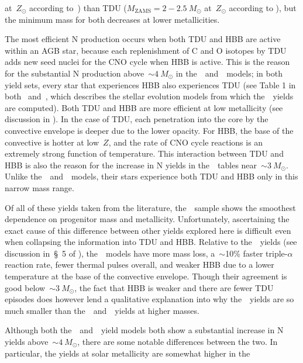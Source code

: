 \documentclass[ms.tex]{subfiles}
\begin{document}
at~$Z_\odot$ according to~\citealt{Karakas2010}) than TDU
($M_\text{ZAMS} = 2 - 2.5~M_\odot$ at~$Z_\odot$ according to
\citealt{Karakas2010}), but the minimum mass for both decreases at lower
metallicities.
\par
The most efficient N production occurs when both TDU and HBB are active within
an AGB star, because each replenishment of C and O isotopes by TDU adds new
seed nuclei for the CNO cycle when HBB is active.
This is the reason for the substantial N production above~$\sim4~M_\odot$ in
the~\karakasten~and~\karakas~models; in both yield sets, every star that
experiences HBB also experiences TDU (see Table 1 in both~\citealt{Karakas2010}
and~\citealt{Karakas2014}, which describes the stellar evolution models from
which the~\karakas~yields are computed).
Both TDU and HBB are more efficient at low metallicity (see discussion in
\citealt{Ventura2013}).
In the case of TDU, each penetration into the core by the convective envelope
is deeper due to the lower opacity.
For HBB, the base of the convective is hotter at low~$Z$, and the rate of CNO
cycle reactions is an extremely strong function of temperature.
This interaction between TDU and HBB is also the reason for the increase in N
yields in the~\ventura~tables near~$\sim3~M_\odot$.
Unlike the~\karakasten~and~\karakas~models, their stars experience both TDU and
HBB only in this narrow mass range.
\par
Of all of these yields taken from the literature, the~\cristallo~sample shows
the smoothest dependence on progenitor mass and metallicity.
Unfortunately, ascertaining the exact cause of this difference between other
yields explored here is difficult even when collapsing the information into
TDU and HBB.
Relative to the~\karakas~yields (see discussion in~\S~5 of
\citealt{Karakas2016}), the~\cristallo~models have more mass loss, a~$\sim$10\%
faster triple-$\alpha$ reaction rate, fewer thermal pulses overall, and weaker
HBB due to a lower temperature at the base of the convective envelope.
Though their agreement is good below~$\sim3~M_\odot$, the fact that HBB is
weaker and there are fewer TDU episodes does however lend a qualitative
explanation into why the~\cristallo~yields are so much smaller than
the~\karakasten~and~\karakas~yields at higher masses.
\par
Although both the~\karakasten~and~\karakas~yield models both show a substantial
increase in N yields above~$\sim4~M_\odot$, there are some notable differences
between the two.
In particular, the yields at solar metallicity are somewhat higher in the
\end{document}
